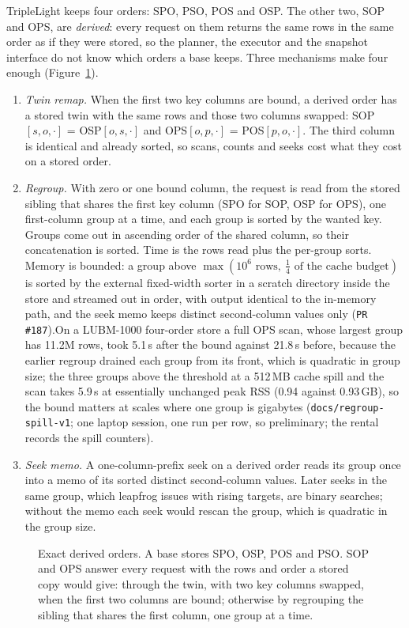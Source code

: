 \documentclass[sigconf, nonacm]{acmart}
\begin{document}
TripleLight keeps four orders: SPO, PSO, POS and OSP. The other two, SOP and OPS, are \emph{derived}: every request on them returns the same rows in the same order as if they were stored, so the planner, the executor and the snapshot interface do not know which orders a base keeps. Three mechanisms make four enough (Figure~\ref{fig:derived}).
\begin{enumerate}
  \item \emph{Twin remap.} When the first two key columns are bound, a derived order has a stored twin with the same rows and those two columns swapped: SOP$[s,o,\cdot]$ = OSP$[o,s,\cdot]$ and OPS$[o,p,\cdot]$ = POS$[p,o,\cdot]$. The third column is identical and already sorted, so scans, counts and seeks cost what they cost on a stored order.
  \item \emph{Regroup.} With zero or one bound column, the request is read from the stored sibling that shares the first key column (SPO for SOP, OSP for OPS), one first-column group at a time, and each group is sorted by the wanted key. Groups come out in ascending order of the shared column, so their concatenation is sorted. Time is the rows read plus the per-group sorts. Memory is bounded: a group above $\max(10^6\text{ rows},\ \tfrac14\text{ of the cache budget})$ is sorted by the external fixed-width sorter in a scratch directory inside the store and streamed out in order, with output identical to the in-memory path, and the seek memo keeps distinct second-column values only (\texttt{PR \#187}).On a LUBM-1000 four-order store a full OPS scan, whose largest group has 11.2M rows, took 5.1\,s after the bound against 21.8\,s before, because the earlier regroup drained each group from its front, which is quadratic in group size; the three groups above the threshold at a 512\,MB cache spill and the scan takes 5.9\,s at essentially unchanged peak RSS (0.94 against 0.93\,GB), so the bound matters at scales where one group is gigabytes (\texttt{docs/regroup-spill-v1}; one laptop session, one run per row, so preliminary; the rental records the spill counters).
  \item \emph{Seek memo.} A one-column-prefix seek on a derived order reads its group once into a memo of its sorted distinct second-column values. Later seeks in the same group, which leapfrog issues with rising targets, are binary searches; without the memo each seek would rescan the group, which is quadratic in the group size.
\end{enumerate}
\begin{figure}[t]
\centering
\resizebox{0.7\textwidth}{!}{}
\caption{Exact derived orders. A base stores SPO, OSP, POS and PSO. SOP and OPS answer every request with the rows and order a stored copy would give: through the twin, with two key columns swapped, when the first two columns are bound; otherwise by regrouping the sibling that shares the first column, one group at a time.}
\label{fig:derived}
\end{figure}
\end{document}
